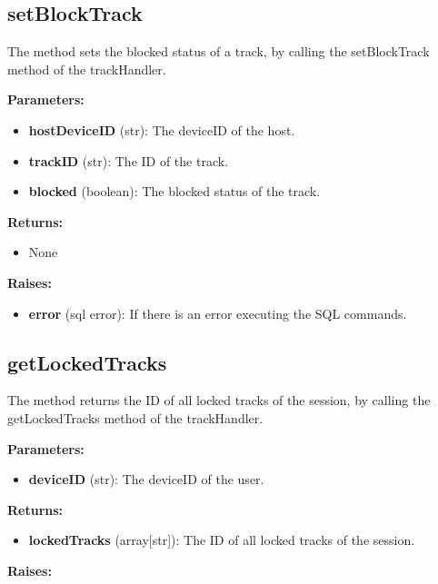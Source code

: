\documentclass[oneside, nenglish]{sdqtechreport}
\begin{document}
\begin{itemize}
\subsection{setBlockTrack}

The method sets the blocked status of a track, by calling the setBlockTrack method of the trackHandler.

\textbf{Parameters:}

\begin{itemize}
    \item \textbf{hostDeviceID} (str): The deviceID of the host.
    \item \textbf{trackID} (str): The ID of the track.
    \item \textbf{blocked} (boolean): The blocked status of the track.
\end{itemize}

\textbf{Returns:}

\begin{itemize}
    \item None
\end{itemize}

\textbf{Raises:}

\begin{itemize}
    \item \textbf{error} (sql error): If there is an error executing the SQL commands.
\end{itemize}


\subsection{getLockedTracks}

The method returns the ID of all locked tracks of the session, by calling the getLockedTracks method of the trackHandler.

\textbf{Parameters:}

\begin{itemize}
    \item \textbf{deviceID} (str): The deviceID of the user.
\end{itemize}

\textbf{Returns:}

\begin{itemize}
    \item \textbf{lockedTracks} (array[str]): The ID of all locked tracks of the session.
\end{itemize}

\textbf{Raises:}


\end{itemize}
\end{document}
